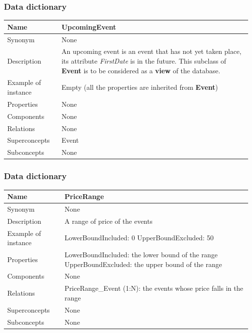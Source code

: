 \documentclass{beamer}
\begin{document}
\begin{frame}
    \frametitle{Data dictionary}
    \begin{table}
    \tiny
    \begin{tabular}{|p{2cm}|p{6cm}|}
    \hline
    Name & \textbf{UpcomingEvent} \\
    \hline
    Synonym & None \\
    \hline
    Description & An upcoming event is an 
    event that has not yet taken place, its attribute \textit{FirstDate} is in the future. \newline
    This subclass of \textbf{Event} is to be considered 
    as a \textbf{view} of the database. \\
    \hline
    Example of instance & Empty (all the properties are inherited from \textbf{Event}) \\
    \hline
    Properties & None \\
    \hline
    Components & None \\
    \hline
    Relations & None \\
    \hline
    Superconcepts & Event \\
    \hline
    Subconcepts & None \\
    \hline
    \end{tabular}
    \end{table}
\end{frame}


\begin{frame}
    \frametitle{Data dictionary}
    \begin{table}
    \tiny
    \begin{tabular}{|p{2cm}|p{6cm}|}
    \hline
    Name & \textbf{PriceRange}  \\
    \hline
    Synonym & None \\
    \hline
    Description & A range of price of the events \\
    \hline
    Example of instance &
    LowerBoundIncluded: 0 \newline
    UpperBoundExcluded: 50 \\
    \hline
    Properties &
    LowerBoundIncluded: the lower bound of the range \newline
    UpperBoundExcluded: the upper bound of the range \\
    \hline
    Components & None \\
    \hline
    Relations &
    PriceRange\_Event (1:N): the events whose price falls in the range \\
    \hline
    Superconcepts & None \\
    \hline
    Subconcepts & None \\
    \hline
    \end{tabular}
    \end{table}
\end{frame}
\end{document}
